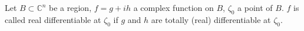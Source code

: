 Let $B \subset \mathbb{C}^n$ be a region, $f = g + ih$ a complex function on $B$, $\zeta_0$ a point of $B$. $f$ is called real differentiable at $\zeta_0$ if $g$ and $h$ are totally (real) differentiable at $\zeta_0$.
